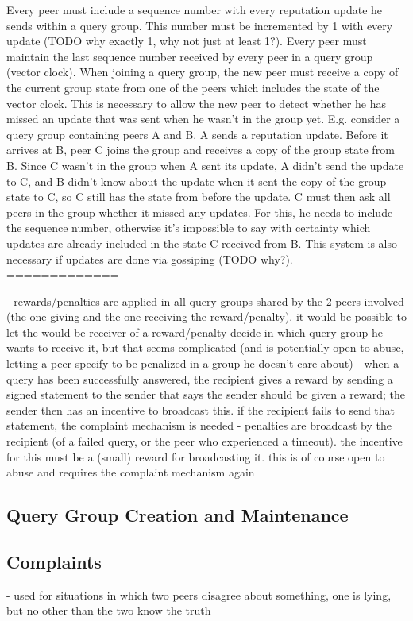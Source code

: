 Every peer must include a sequence number with every reputation update he sends
within a query group. This number must be incremented by 1 with every update
(TODO why exactly 1, why not just at least 1?).
Every peer must maintain the last sequence number received by every peer in a
query group (vector clock). When joining a query group, the new peer must
receive a copy of the current group state from one of the peers which includes
the state of the vector clock. This is necessary to allow the new peer to detect
whether he has missed an update that was sent when he wasn't in the group yet.
E.g. consider a query group containing peers A and B. A sends a reputation
update. Before it arrives at B, peer C joins the group and receives a copy of
the group state from B. Since C wasn't in the group when A sent its update, A
didn't send the update to C, and B didn't know about the update when it sent the
copy of the group state to C, so C still has the state from before the update. C
must then ask all peers in the group whether it missed any updates. For this, he
needs to include the sequence number, otherwise it's impossible to say with
certainty which updates are already included in the state C received from B.
This system is also necessary if updates are done via gossiping (TODO why?).
=============

- rewards/penalties are applied in all query groups shared by the 2 peers
  involved (the one giving and the one receiving the reward/penalty). it would
  be possible to let the would-be receiver of a reward/penalty decide in which
  query group he wants to receive it, but that seems complicated (and is
  potentially open to abuse, letting a peer specify to be penalized in a group
  he doesn't care about)
- when a query has been successfully answered, the recipient gives a reward by
  sending a signed statement to the sender that says the sender should be given
  a reward; the sender then has an incentive to broadcast this. if the recipient
  fails to send that statement, the complaint mechanism is needed
- penalties are broadcast by the recipient (of a failed query, or the peer who
  experienced a timeout). the incentive for this must be a (small) reward for
  broadcasting it. this is of course open to abuse and requires the complaint
  mechanism again
\subsection{Query Group Creation and Maintenance}
\subsection{Complaints}
- used for situations in which two peers disagree about something, one is lying,
  but no other than the two know the truth

